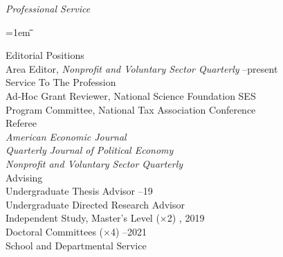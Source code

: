 \documentclass[12pt]{article}
\newlength{\midlength}
\newlength{\firstlength}
\newlength{\listindent}
\newlength{\dategap}
\newlength{\wrapgap}
\newcommand{\heading}[1]{
	{\setlength{\parskip}{0.8cm plus6mm minus3mm}
	\parindent=0pt
	\large \textit{{#1}}}
	\vspace{0.1em}
}
\newenvironment{datetabbing}{
	\begin{tabbing}
	\parskip=1em
	\hspace*{\listindent}\=\hspace*{\firstlength}\=\hspace*{\midlength}\= \kill
}{
	\end{tabbing}
}
\begin{document}

\clearpage
\heading{Professional Service}


\begin{datetabbing}	
\>  Editorial Positions																\\[\wrapgap]
\>	\>	Area Editor, \textit{Nonprofit and Voluntary Sector Quarterly}
															--present	\'	\\[\dategap]
\>  Service To The Profession														\\[\wrapgap]
\>	\>	Ad-Hoc Grant Reviewer, National Science Foundation SES				\'	\\[\wrapgap]
\>	\>	Program Committee, National Tax Association Conference 				\'	\\[\dategap]
\>	Referee																			\\[\wrapgap]
\>	\>	\textit{American Economic Journal}											\\[\wrapgap]
\>	\>	\textit{Quarterly Journal of Political Economy}								\\[\wrapgap]
\>	\>	\textit{Nonprofit and Voluntary Sector Quarterly}							\\[\dategap]
\>	Advising																		\\[\wrapgap]
\>	\>	Undergraduate Thesis Advisor 						--19	\'	\\[\wrapgap]
\>	\>	Undergraduate Directed Research Advisor						\'	\\[\wrapgap]
\>	\>	Independent Study, Master's Level ($\times$2)		, 2019	\'	\\[\wrapgap]
\>	\>	Doctoral Committees	 ($\times$4)						--2021	\'	\\[\dategap]
\>	School and Departmental Service													\\[\wrapgap]

\end{datetabbing}
\end{document}
